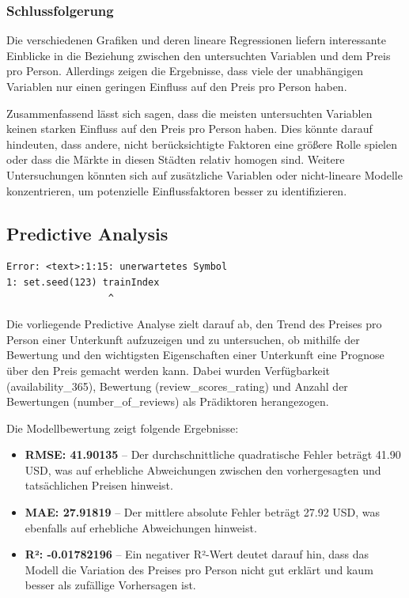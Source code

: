 \documentclass[
  journal,
]{IEEEtran}%
\begin{document}
\subsubsection{Schlussfolgerung}\label{schlussfolgerung}

Die verschiedenen Grafiken und deren lineare Regressionen liefern
interessante Einblicke in die Beziehung zwischen den untersuchten
Variablen und dem Preis pro Person. Allerdings zeigen die Ergebnisse,
dass viele der unabhängigen Variablen nur einen geringen Einfluss auf
den Preis pro Person haben.

Zusammenfassend lässt sich sagen, dass die meisten untersuchten
Variablen keinen starken Einfluss auf den Preis pro Person haben. Dies
könnte darauf hindeuten, dass andere, nicht berücksichtigte Faktoren
eine größere Rolle spielen oder dass die Märkte in diesen Städten
relativ homogen sind. Weitere Untersuchungen könnten sich auf
zusätzliche Variablen oder nicht-lineare Modelle konzentrieren, um
potenzielle Einflussfaktoren besser zu identifizieren.

\subsection{Predictive Analysis}\label{predictive-analysis-1}

\begin{verbatim}
Error: <text>:1:15: unerwartetes Symbol
1: set.seed(123) trainIndex
                  ^
\end{verbatim}

Die vorliegende Predictive Analyse zielt darauf ab, den Trend des
Preises pro Person einer Unterkunft aufzuzeigen und zu untersuchen, ob
mithilfe der Bewertung und den wichtigsten Eigenschaften einer
Unterkunft eine Prognose über den Preis gemacht werden kann. Dabei
wurden Verfügbarkeit (availability\_365), Bewertung
(review\_scores\_rating) und Anzahl der Bewertungen
(number\_of\_reviews) als Prädiktoren herangezogen.

Die Modellbewertung zeigt folgende Ergebnisse:

\begin{itemize}
\item
  \textbf{RMSE: 41.90135} -- Der durchschnittliche quadratische Fehler
  beträgt 41.90 USD, was auf erhebliche Abweichungen zwischen den
  vorhergesagten und tatsächlichen Preisen hinweist.
\item
  \textbf{MAE: 27.91819} -- Der mittlere absolute Fehler beträgt 27.92
  USD, was ebenfalls auf erhebliche Abweichungen hinweist.
\item
  \textbf{R²: -0.01782196} -- Ein negativer R²-Wert deutet darauf hin,
  dass das Modell die Variation des Preises pro Person nicht gut erklärt
  und kaum besser als zufällige Vorhersagen ist.
\end{itemize}
\end{document}
